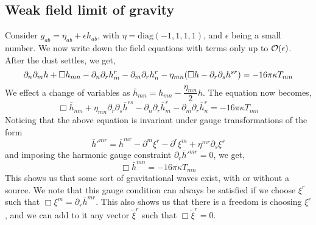 \documentclass[a4paper,11pt]{article}
\begin{document}
\subsection{Weak field limit of gravity} 
Consider $ g_{ab} = \eta_{ab} + \epsilon h_{ab} $, with $  \eta = \text{diag} (-1,1,1,1) $, and $ \epsilon $ being a small number. We now write down the field equations with terms only up to $ \order{\epsilon} $. After the dust settles, we get,
\begin{equation*}
\partial_n \partial_m h + \Box h_{mn} - \partial_n \partial_r h^r_m - \partial_m \partial_r h^r_n - \eta_{mn} \qty(\Box h - \partial_r \partial_s h^{sr}) = - 16 \pi \kappa T_{mn}
\end{equation*}
We effect a change of variables as $ \bar{h}_{mn} = h_{mn} - \dfrac{\eta_{mn}}{2} h $. The equation now becomes,
\begin{equation*}
\Box \bar{h}_{mn} + \eta_{mn} \partial_r \partial_s \bar{h}^{rs} - \partial_n \partial_r \bar{h}^r_m - \partial_m \partial_r \bar{h}^r_n = - 16 \pi \kappa T_{mn}
\end{equation*}
Noticing that the above equation is invariant under gauge transformations of the form \begin{equation*}
\bar{h}'^{mr} = \bar{h}^{mr} - \partial^m \xi^r - \partial^r \xi^m + \eta^{mr} \partial_s \xi^s
\end{equation*}
and imposing the harmonic gauge constraint $\partial_r \bar{h}'^{mr} =0 $, we get,
\begin{equation*}
\Box \bar{h}^{mn} = - 16 \pi \kappa T_{mn}
\end{equation*}
This shows us that some sort of gravitational waves exist, with or without a source. We note that this gauge condition can always be satisfied if we choose $ \xi^r $ such that $ \Box \xi^m =  \partial_r \bar{h}^{mr}$. This also shows us that there is a freedom is choosing $ \xi^r $, and we can add to it any vector $ \tilde{\xi}^r $ such that $ \Box \tilde{\xi}^r = 0 $.
\end{document}
